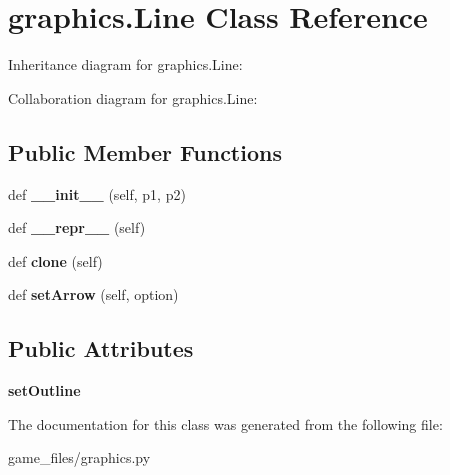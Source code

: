 \hypertarget{classgraphics_1_1Line}{}\section{graphics.\+Line Class Reference}
\label{classgraphics_1_1Line}


Inheritance diagram for graphics.\+Line\+:


Collaboration diagram for graphics.\+Line\+:
\subsection*{Public Member Functions}
\begin{DoxyCompactItemize}
\item 
def {\bfseries \+\_\+\+\_\+init\+\_\+\+\_\+} (self, p1, p2)\hypertarget{classgraphics_1_1Line_a8aab9ed90de9a987a2ea6446caca2188}{}\label{classgraphics_1_1Line_a8aab9ed90de9a987a2ea6446caca2188}

\item 
def {\bfseries \+\_\+\+\_\+repr\+\_\+\+\_\+} (self)\hypertarget{classgraphics_1_1Line_a9f0196b56e225e7c1688b55486848ad5}{}\label{classgraphics_1_1Line_a9f0196b56e225e7c1688b55486848ad5}

\item 
def {\bfseries clone} (self)\hypertarget{classgraphics_1_1Line_a2691c6ba64cfb04f32a585d40f1a7e1e}{}\label{classgraphics_1_1Line_a2691c6ba64cfb04f32a585d40f1a7e1e}

\item 
def {\bfseries set\+Arrow} (self, option)\hypertarget{classgraphics_1_1Line_aef621dc2bfe50449ac764fda18ede3b6}{}\label{classgraphics_1_1Line_aef621dc2bfe50449ac764fda18ede3b6}

\end{DoxyCompactItemize}
\subsection*{Public Attributes}
\begin{DoxyCompactItemize}
\item 
{\bfseries set\+Outline}\hypertarget{classgraphics_1_1Line_a2462ca216d643515e7956d8e3688bf44}{}\label{classgraphics_1_1Line_a2462ca216d643515e7956d8e3688bf44}

\end{DoxyCompactItemize}


The documentation for this class was generated from the following file\+:\begin{DoxyCompactItemize}
\item 
game\+\_\+files/graphics.\+py\end{DoxyCompactItemize}

